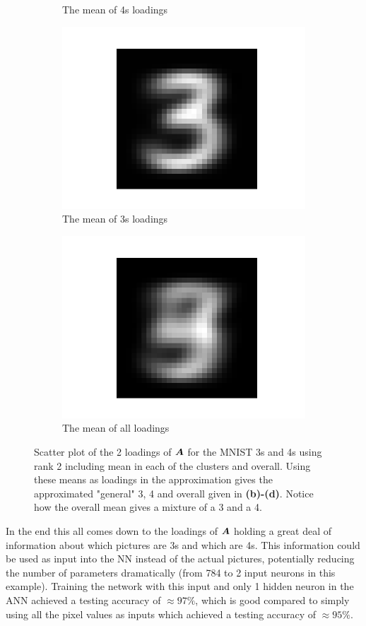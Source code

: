 \begin{figure}
\begin{subfigure}{0.3\linewidth}
        \caption{The mean of 4s loadings}
    \end{subfigure}
    \begin{subfigure}{0.3\linewidth}
    \centering
        \includegraphics[width=.5\linewidth]{Pics/06_results/general3.png}
        \caption{The mean of 3s loadings}
    \end{subfigure}
    \begin{subfigure}{0.3\linewidth}
    \centering
        \includegraphics[width=.5\linewidth]{Pics/06_results/general.png}
        \caption{The mean of all loadings}
        \label{Hej}
    \end{subfigure}
    \caption{Scatter plot of the 2 loadings of $\boldsymbol{A}$ for the MNIST 3s and 4s using rank 2 including mean in each of the clusters and overall. Using these means as loadings in the approximation gives the approximated "general" 3, 4 and overall given in \textbf{(b)-(d)}. Notice how the overall mean gives a mixture of a 3 and a 4.}
    \label{fig:loadingsOfA}
\end{figure}

In the end this all comes down to the loadings of $\boldsymbol{A}$ holding a great deal of information about which pictures are 3s and which are 4s. This information could be used as input into the NN instead of the actual pictures, potentially reducing the number of parameters dramatically (from 784 to 2 input neurons in this example). Training the network with this input and only 1 hidden neuron in the ANN achieved a testing accuracy of $\approx 97 \%$, which is good compared to simply using all the pixel values as inputs which achieved a testing accuracy of $\approx 95\%$.

